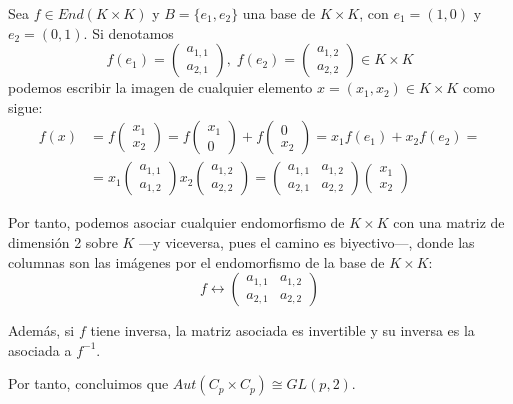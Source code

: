 \documentclass[a4paper, 11pt]{article}
\begin{document}
\begin{solucion}
      Sea $f \in End(K \times K)$ y $B=\{e_1,e_2\}$ una base de $K \times K$, con $e_1=(1,0)$ y $e_2=(0,1)$. Si denotamos
      \[
      f(e_1) =
      \left( \begin{array}{c}
        a_{1,1} \\
        a_{2,1}
      \end{array}
      \right),\;
      f(e_2) =
      \left( \begin{array}{c}
        a_{1,2} \\
        a_{2,2}
      \end{array}
      \right) \in K \times K
      \]
      podemos escribir la imagen de cualquier elemento $x=(x_1,x_2) \in K \times K$ como sigue:
      \begin{align*}
          f(x) &= f\left(\begin{array}{c} x_1 \\ x_2 \end{array} \right) =
          f\left(\begin{array}{c} x_1 \\ 0 \end{array} \right) +
          f\left(\begin{array}{c} 0 \\ x_2 \end{array} \right) = x_1 f(e_1) + x_2 f(e_2) =\\
          &= x_1\left(\begin{array}{c} a_{1,1} \\ a_{1,2} \end{array} \right)
          x_2\left(\begin{array}{c} a_{1,2} \\ a_{2,2} \end{array} \right) =
          \left( \begin{array}{cc} a_{1,1} & a_{1,2} \\ a_{2,1} & a_{2,2}\end{array}\right)\left(\begin{array}{c} x_1 \\ x_2 \end{array} \right)
      \end{align*}

      Por tanto, podemos asociar cualquier endomorfismo de $K \times K$ con una matriz de dimensión 2 sobre $K$ ---y viceversa, pues el camino es biyectivo---, donde las columnas son las imágenes por el endomorfismo de la base de $K \times K$:
      \[
      f \longleftrightarrow \left( \begin{array}{cc} a_{1,1} & a_{1,2} \\ a_{2,1} & a_{2,2}\end{array}\right)
      \]

      Además, si $f$ tiene inversa, la matriz asociada es invertible y su inversa es la asociada a $f^{-1}$.

      Por tanto, concluimos que $Aut(C_p \times C_p)  \cong GL(p,2)$.
  \end{solucion}
\end{document}

